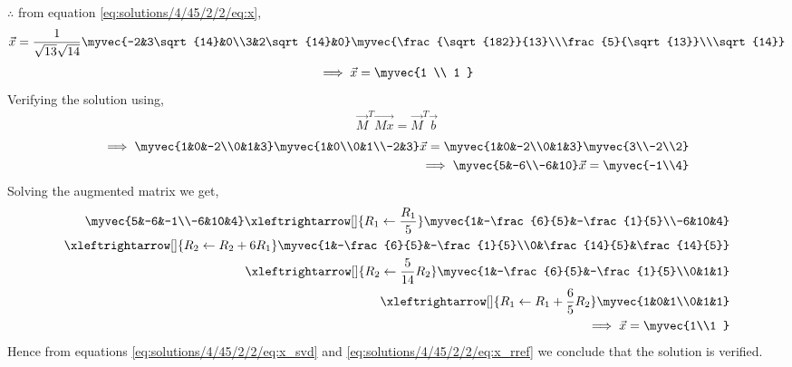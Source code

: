 $\therefore$ from equation \eqref{eq:solutions/4/45/2/2/eq:x},
\begin{align}
\vec{x} = \frac{1}{\sqrt{13}\sqrt{14}}\myvec{-2&3\sqrt{14}&0\\3&2\sqrt{14}&0} \myvec{\frac{\sqrt{182}}{13}\\\frac{5}{\sqrt{13}}\\\sqrt{14}}\label{eq:solutions/4/45/2/2/eq:fx}
\end{align} 
\begin{align}
\implies \vec{x} = \myvec{1 \\ 1 } \label{eq:solutions/4/45/2/2/eq:x_svd}
\end{align}
Verifying the solution using,
\begin{align}
\vec{M}^T\vec{Mx} = \vec{M}^T\vec{b}
\end{align}
\begin{align}
\implies \myvec{1&0&-2\\0&1&3} \myvec{1&0\\0&1\\-2&3} \vec{x} = \myvec{1&0&-2\\0&1&3}\myvec{3\\-2\\2}\\
\implies \myvec{5&-6\\-6&10}\vec{x} = \myvec{-1\\4}
\end{align}
Solving the augmented matrix we get,
\begin{align}
\myvec{5&-6&-1\\-6&10&4}\xleftrightarrow[]{R_1\leftarrow\frac{R_1}{5}}\myvec{1&-\frac{6}{5}&-\frac{1}{5}\\-6&10&4}\\
\xleftrightarrow[]{R_2\leftarrow R_2+6R_1}\myvec{1&-\frac{6}{5}&-\frac{1}{5}\\0&\frac{14}{5}&\frac{14}{5}}\\
\xleftrightarrow[]{R_2\leftarrow \frac{5}{14}R_2}\myvec{1&-\frac{6}{5}&-\frac{1}{5}\\0&1&1}\\
\xleftrightarrow[]{R_1\leftarrow R_1+\frac{6}{5}R_2}\myvec{1&0&1\\0&1&1}\\
\implies \vec{x} = \myvec{1\\1 }\label{eq:solutions/4/45/2/2/eq:x_rref}
\end{align}
Hence from equations \eqref{eq:solutions/4/45/2/2/eq:x_svd} and \eqref{eq:solutions/4/45/2/2/eq:x_rref} we conclude that the solution is verified.  
